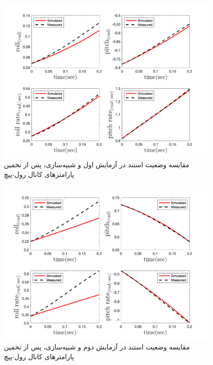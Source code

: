\begin{figure}[H]
	\includegraphics[width=12cm]{../../Figures/RCP/roll_pitch_parameter_estimation/RCP_roll_pitch_S1.png}
	\centering
	\caption{مقايسه وضعیت استند در  آزمايش اول و شبیه‌سازی، پس از تخمین پارامترهای کانال رول-پیچ}
	\label{roll_pitch_ps1}
\end{figure}
\begin{figure}[H]
	\includegraphics[width=12cm]{../../Figures/RCP/roll_pitch_parameter_estimation/RCP_roll_pitch_S2.png}
	\centering
	\caption{مقايسه وضعیت استند در  آزمايش دوم و شبیه‌سازی، پس از تخمین پارامترهای کانال رول-پیچ}
	\label{roll_pitch_ps2}
\end{figure}
